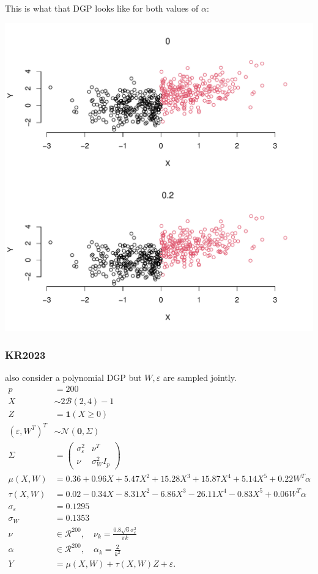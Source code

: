 \documentclass[11pt]{article}
\begin{document}
This is what that DGP looks like for both values of
\(\alpha\):

\begin{center}
\includegraphics[width=.9\linewidth]{FH2019.pdf}
\end{center}

\subsubsection{KR2023}
\label{sec:org4489f39}
\cite{kreiss2021inference} also consider a polynomial DGP but
\(W,\varepsilon\) are sampled jointly.
\begin{equation}
  \begin{split}
    p &= 200\\
    X &\sim 2 \mathcal{B}(2,4) - 1\\
    Z &= \mathbf{1}(X \geq 0)\\
    (\varepsilon,W^T)^T &\sim \mathcal{N}(\mathbf{0},\Sigma)\\
    \Sigma &= \begin{pmatrix}
      \sigma^2_{\varepsilon} & \nu^T\\
      \nu & \sigma^2_W I_p
    \end{pmatrix}\\
    \mu(X,W) &= 0.36 + 0.96 X + 5.47 X^2 + 15.28 X^3 + 15.87 X^4 + 5.14 X^5 + 0.22 W^T \alpha\\
    \tau(X,W) &= 0.02 - 0.34 X - 8.31 X^2 - 6.86 X^3 - 26.11 X^4 - 0.83 X^5 + 0.06 W^T \alpha\\
    \sigma_{\varepsilon} &= 0.1295\\
    \sigma_W &= 0.1353\\
    \nu &\in \mathcal{R}^{200}, \quad \nu_k = \frac{0.8 \sqrt{6}\sigma^2_{\varepsilon}}{\pi k}\\
    \alpha &\in \mathcal{R}^{200}, \quad \alpha_k = \frac{2}{k^2}\\
    Y &= \mu(X,W) + \tau(X,W) Z + \varepsilon.
  \end{split}
\end{equation}
\end{document}
